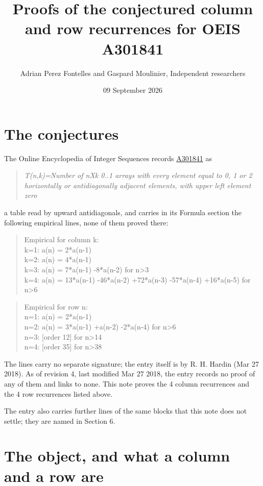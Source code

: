 \documentclass[11pt]{article}
\title{Proofs of the conjectured column and row recurrences for OEIS A301841}
\author{Adrian Perez Fontelles and Gaspard Moulinier, Independent researchers}
\date{09 September 2026}
\theoremstyle{definition}
\begin{document}
\maketitle
\section{The conjectures}

The Online Encyclopedia of Integer Sequences records \href{https://oeis.org/A301841}{A301841} as

\begin{quote}\itshape T(n,k)=Number of nXk 0..1 arrays with every element equal to 0, 1 or 2 horizontally or antidiagonally adjacent elements, with upper left element zero\end{quote}

a table read by upward antidiagonals, and carries in its Formula section the following empirical lines, none of them proved there:

\begin{quote}\ttfamily Empirical for column k:\\
k=1: a(n) = 2*a(n-1)\\k=2: a(n) = 4*a(n-1)\\k=3: a(n) = 7*a(n-1) -8*a(n-2) for n>3\\k=4: a(n) = 13*a(n-1) -46*a(n-2) +72*a(n-3) -57*a(n-4) +16*a(n-5) for n>6\end{quote}

\begin{quote}\ttfamily Empirical for row n:\\
n=1: a(n) = 2*a(n-1)\\n=2: a(n) = 3*a(n-1) +a(n-2) -2*a(n-4) for n>6\\n=3: [order 12] for n>14\\n=4: [order 35] for n>38\end{quote}

The lines carry no separate signature; the entry itself is by R. H. Hardin (Mar 27 2018). As of revision 4, last modified Mar 27 2018, the entry records no proof of any of them and links to none. This note proves the 4 column recurrences and the 4 row recurrences listed above.

The entry also carries further lines of the same blocks that this note does not settle; they are named in Section 6.

\section{The object, and what a column and a row are}
\end{document}
